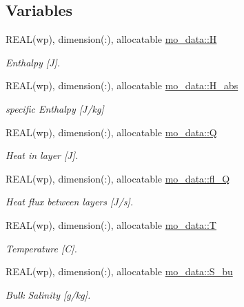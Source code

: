 \subsection*{Variables}
\begin{DoxyCompactItemize}
\item 
REAL(wp), dimension(:), allocatable \hyperlink{namespacemo__data_ad27ff95f4bfe7ed6f5643d3953a9310e}{mo\_\-data::H}
\begin{DoxyCompactList}\small\item\em Enthalpy \mbox{[}J\mbox{]}. \item\end{DoxyCompactList}\item 
REAL(wp), dimension(:), allocatable \hyperlink{namespacemo__data_a763929f604ab797932f22f50a720a1a1}{mo\_\-data::H\_\-abs}
\begin{DoxyCompactList}\small\item\em specific Enthalpy \mbox{[}J/kg\mbox{]} \item\end{DoxyCompactList}\item 
REAL(wp), dimension(:), allocatable \hyperlink{namespacemo__data_aa221cb1abb5ab4f4d2e8ca7987aeed56}{mo\_\-data::Q}
\begin{DoxyCompactList}\small\item\em Heat in layer \mbox{[}J\mbox{]}. \item\end{DoxyCompactList}\item 
REAL(wp), dimension(:), allocatable \hyperlink{namespacemo__data_a594603db2866303fb0074ab34692fa4a}{mo\_\-data::fl\_\-Q}
\begin{DoxyCompactList}\small\item\em Heat flux between layers \mbox{[}J/s\mbox{]}. \item\end{DoxyCompactList}\item 
REAL(wp), dimension(:), allocatable \hyperlink{namespacemo__data_a0969de41af73c828aa2ff388011081ba}{mo\_\-data::T}
\begin{DoxyCompactList}\small\item\em Temperature \mbox{[}C\mbox{]}. \item\end{DoxyCompactList}\item 
REAL(wp), dimension(:), allocatable \hyperlink{namespacemo__data_a24861c159e2b136fb56a61bc9f2de7a7}{mo\_\-data::S\_\-bu}
\begin{DoxyCompactList}\small\item\em Bulk Salinity \mbox{[}g/kg\mbox{]}. \item\end{DoxyCompactList}\item 

\end{DoxyCompactItemize}
